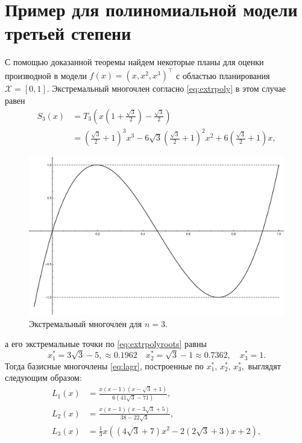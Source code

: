 \documentclass[specialist,
               substylefile = spbu.rtx,
               subf,href,colorlinks=true, 12pt]{disser}
\theoremstyle{definition}
\begin{document}
	\section{Пример для полиномиальной модели третьей степени}
	\label{sec:ex}
	С помощью доказанной теоремы найдем некоторые планы для оценки производной в модели $f(x)  = (x, x^2, x^3)^\top$ с областью планирования $\mathcal{X} = [0, 1]$. Экстремальный многочлен согласно \eqref{eq:extrpoly} в этом случае равен 
	\begin{align*}
		S_3(x) &= T_3\left(x \left(1 + \frac{\sqrt{3}}{2} \right) -  \frac{\sqrt{3}}{2} \right) \\ 
		&= \left(\frac{\sqrt{3}}{2}+1\right)^3 x^3-6 \sqrt{3} \left(\frac{\sqrt{3}}{2}+1\right)^2 x^2+6 \left(\frac{\sqrt{3}}{2}+1\right) x,
	\end{align*}
	\begin{figure}
		\includegraphics[width=\textwidth]{fig/s3.pdf}
		\caption{Экстремальный многочлен для $n = 3$.}
	\end{figure}
	а его экстремальные точки по \eqref{eq:extrpolyroots} равны 
	\begin{equation}
	\label{eq:ex:point}
		x_1^* = 3 \sqrt{3} - 5, \approx 0.1962 \quad x_2^* = \sqrt{3} - 1 \approx 0.7362, \quad x_3^* = 1.
	\end{equation}
	Тогда базисные многочлены \eqref{eq:lagr}, построенные по $x_1^*, \,x_2^*, \,x_3^*,$  выглядят следующим образом:
	\begin{align*}
		L_1(x) &= \frac{x (x - 1) (x - \sqrt{3} + 1)}{6 (41 \sqrt{3} - 71)}, \\
		L_2(x) &= \frac{x (x - 1) \left(x-3 \sqrt{3}+5\right)}{38 - 22 \sqrt{3}},\\
		L_3(x) &= \frac{1}{3} x \left(\left(4 \sqrt{3}+7\right) x^2-2 \left(2 \sqrt{3}+3\right) x+2\right) ,
	\end{align*}
\end{document}
